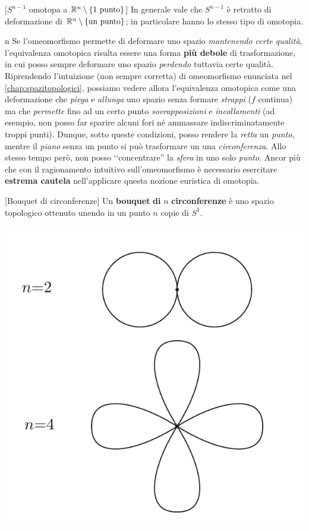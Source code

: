 \begin{corollary}{}[$S^{n-1}$ omotopa a $\R^n\setminus\left\{1\ \text{punto}\right\}$]
	In generale vale che $S^{n-1}$ è retratto di deformazione di $\mathbb{R}^n\setminus\left\{\text{un punto}\right\}$; in particolare hanno lo stesso tipo di omotopia.
\end{corollary}
\begin{intuitively}{n}
	Se l'omeomorfismo permette di deformare uno spazio \textit{mantenendo certe qualità}, l'equivalenza omotopica risulta essere una forma \textbf{più debole} di trasformazione, in cui posso sempre deformare uno spazio \textit{perdendo} tuttavia certe qualità. Riprendendo l'intuizione (non sempre corretta) di omeomorfismo enunciata nel \autoref{chap:spazitopologici}, possiamo vedere allora l'equivalenza omotopica come una deformazione che \textit{piega} e \textit{allunga} uno spazio senza formare \textit{strappi} ($f$ continua) ma che \textit{permette} fino ad un certo punto \textit{sovrapposizioni} e \textit{incollamenti} (ad esempio, non posso far sparire alcuni fori né ammassare indiscriminatamente troppi punti). Dunque, sotto queste condizioni, posso rendere la \textit{retta} un \textit{punto}, mentre il \textit{piano} senza un punto si può trasformare un una \textit{circonferenza}. Allo stesso tempo però, non posso ‘‘concentrare'' la \textit{sfera} in uno solo \textit{punto}.	Ancor più che con il ragionamento intuitivo sull'omeomorfismo è necessario esercitare \textbf{estrema cautela} nell'applicare questa nozione euristica di omotopia.
\end{intuitively}
\begin{definition}{}[Bouquet di circonferenze]\label{bouquet}
Un \textbf{bouquet} \textbf{di} $n$ \textbf{circonferenze} è uno spazio topologico ottenuto unendo in un punto $n$ copie di $S^1$.
\begin{center}
	\includegraphics[trim=0cm 0cm 0cm 0cm,clip,scale=0.7]{images/bouquet.pdf}
\end{center}
\end{definition}
